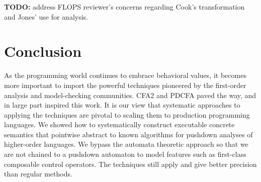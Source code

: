 \textbf{TODO:} address FLOPS reviewer's concerns regarding Cook's transformation and Jones' use for analysis.

\section{Conclusion}

As the programming world continues to embrace behavioral values, it becomes more important to import the powerful techniques pioneered by the first-order analysis and model-checking communities.
%
CFA2 and PDCFA paved the way, and in large part inspired this work.
%
It is our view that systematic approaches to applying the techniques are pivotal to scaling them to production programming languages.
%
We showed how to systematically construct executable concrete semantics that pointwise abstract to known algorithms for pushdown analyses of higher-order languages.
%
We bypass the automata theoretic approach so that we are not chained to a pushdown automaton to model features such as first-class composable control operators.
%
The techniques still apply and give better precision than regular methods.


%

